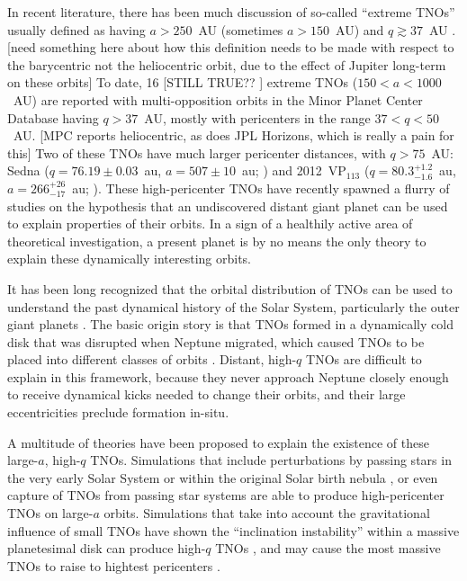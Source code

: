 \documentclass{aastex62}
\begin{document}
In recent literature, there has been much discussion of so-called ``extreme TNOs'' usually defined as having $a>250$~AU (sometimes $a>150$~AU) and $q\gtrsim37$~AU \citep{Sheppardetal2016,bannister17}.
[need something here about how this definition needs to be made with respect to the barycentric not the heliocentric orbit, due to the effect of Jupiter long-term on these orbits]
To date, 16 [STILL TRUE?? ] extreme TNOs ($150<a<1000$~AU) are reported with multi-opposition orbits in the Minor Planet Center Database having $q>37$~AU, mostly with pericenters in the range $37<q<50$~AU.
[MPC reports heliocentric, as does JPL Horizons, which is really a pain for this]
Two of these TNOs have much larger pericenter distances, with $q>75$~AU: Sedna ($q=76.19 \pm 0.03$~au, $a=507 \pm 10$~au; \citealt{brownetal04}) and 2012~VP$_{113}$ ($q=80.3^{+1.2}_{-1.6}$~au, $a = 266^{+26}_{-17}$~au; \citealt{trujillosheppard14}). 
These high-pericenter TNOs have recently spawned a flurry of studies on the hypothesis that an undiscovered distant giant planet can be used to explain properties of their orbits. 
In a sign of a healthily active area of theoretical investigation, a present planet is by no means the only theory to explain these dynamically interesting orbits.

It has been long recognized that the orbital distribution of TNOs can be used to understand the past dynamical history of the Solar System, particularly the outer giant planets \citep{malhotra93,levison08}.
The basic origin story is that TNOs formed in a dynamically cold disk that was disrupted when Neptune migrated, which caused TNOs to be placed into different classes of orbits \citep[see][]{gladman08}.  
Distant, high-$q$ TNOs are difficult to explain in this framework, because they never approach Neptune closely enough to receive dynamical kicks needed to change their orbits, and their large eccentricities preclude formation in-situ.  

A multitude of theories have been proposed to explain the existence of these large-$a$, high-$q$ TNOs.
Simulations that include perturbations by passing stars in the very early Solar System \citep{kenyonbromley04,morbidellilevison04,KaibQuinn2008,Pfalzneretal2018} or within the original Solar birth nebula \citep{brasser12,brasserschwamb15}, or even capture of TNOs from passing star systems \citep{kenyonbromley04,Jilkovaetal2015} are able to produce high-pericenter TNOs on large-$a$ orbits.
Simulations that take into account the gravitational influence of small TNOs have shown the ``inclination instability'' within a massive planetesimal disk can produce high-$q$ TNOs \citep{madigan2016}, and may cause the most massive TNOs to raise to hightest pericenters \citep{Fleisigetal2018}.
\end{document}
